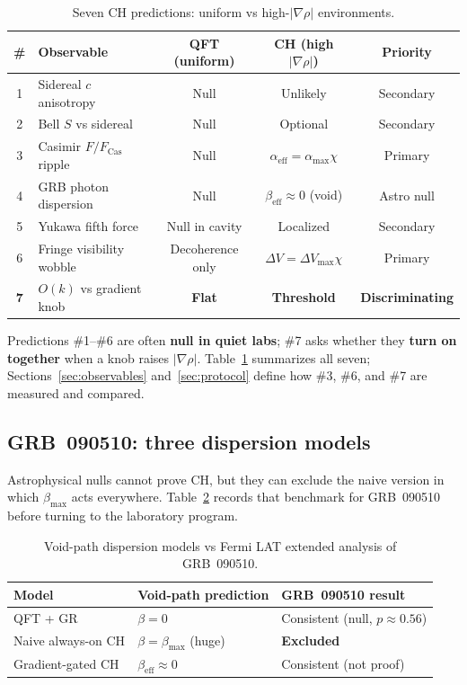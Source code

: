 \documentclass[11pt,a4paper]{article}
\begin{document}
\begin{table}[htbp]
  \centering
  \caption{Seven CH predictions: uniform vs high-$|\nabla\rho|$ environments.}
  \label{tab:predictions}
  \small
  \begin{tabular}{@{}clccc@{}}
    \toprule
    \# & Observable & QFT (uniform) & CH (high $|\nabla\rho|$) & Priority \\
    \midrule
    1 & Sidereal $c$ anisotropy & Null & Unlikely & Secondary \\
    2 & Bell $S$ vs sidereal & Null & Optional & Secondary \\
    3 & Casimir $F/F_{\mathrm{Cas}}$ ripple & Null & $\alpha_{\mathrm{eff}}=\alpha_{\max}\chi$ & Primary \\
    4 & GRB photon dispersion & Null & $\beta_{\mathrm{eff}}\approx 0$ (void) & Astro null \\
    5 & Yukawa fifth force & Null in cavity & Localized & Secondary \\
    6 & Fringe visibility wobble & Decoherence only & $\Delta V=\Delta V_{\max}\chi$ & Primary \\
    \textbf{7} & $O(k)$ vs gradient knob & \textbf{Flat} & \textbf{Threshold} & \textbf{Discriminating} \\
    \bottomrule
  \end{tabular}
\end{table}

Predictions \#1--\#6 are often \textbf{null in quiet labs}; \#7 asks whether they \textbf{turn on together} when a knob raises $|\nabla\rho|$.
Table~\ref{tab:predictions} summarizes all seven; Sections~\ref{sec:observables} and~\ref{sec:protocol} define how \#3, \#6, and \#7 are measured and compared.

\subsection{GRB~090510: three dispersion models}

Astrophysical nulls cannot prove CH, but they can exclude the naive version in which $\beta_{\max}$ acts everywhere.
Table~\ref{tab:grb} records that benchmark for GRB~090510 before turning to the laboratory program.

\begin{table}[htbp]
  \centering
  \caption{Void-path dispersion models vs Fermi LAT extended analysis of GRB~090510.}
  \label{tab:grb}
  \begin{tabular}{@{}lll@{}}
    \toprule
    Model & Void-path prediction & GRB~090510 result \\
    \midrule
    QFT + GR & $\beta = 0$ & Consistent (null, $p \approx 0.56$) \\
    Naive always-on CH & $\beta = \beta_{\max}$ (huge) & \textbf{Excluded} \\
    Gradient-gated CH & $\beta_{\mathrm{eff}} \approx 0$ & Consistent (not proof) \\
    \bottomrule
  \end{tabular}
\end{table}
\end{document}
